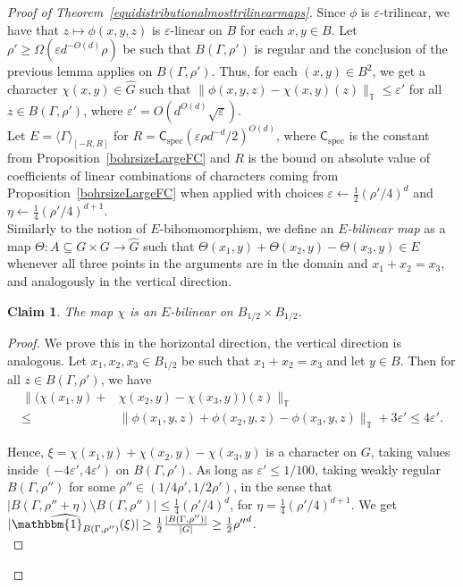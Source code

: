 \documentclass[a4paper,11pt]{article}
\numberwithin{theorem}{section}
\newtheorem{claim}[theorem]{Claim}
\theoremstyle{definition}
\newcommand\id{\mathbbm{1}}
\newcommand{\on}[1]{
	\operatorname{#1}
}
\begin{document}
\begin{proof}[Proof of Theorem~\ref{equidistributionalmosttrilinearmaps}]
    Since $\phi$ is $\varepsilon$-trilinear, we have that $z\mapsto \phi(x,y, z)$ is $\varepsilon$-linear on $B$ for each $x, y \in B$. Let $\rho' \geq \Omega(\varepsilon d^{-O(d)}\rho)$ be such that $B(\Gamma, \rho')$ is regular and the conclusion of the previous lemma applies on $B(\Gamma, \rho')$. Thus, for each $(x,y) \in B^2$, we get a character $\chi(x,y) \in \hat{G}$ such that $\|\phi(x,y, z) - \chi(x,y)(z)\|_{\mathbb{T}} \leq \varepsilon'$ for all $z \in B(\Gamma, \rho')$, where $\varepsilon' = O(d^{O(d)}\sqrt{\varepsilon})$. \\

    Let $E = \langle \Gamma \rangle_{[-R, R]}$ for $R = \mathsf{C}_{\on{spec}}(\varepsilon\rho d^{-d}/2)^{O(d)}$, where $\mathsf{C}_{\on{spec}}$ is the constant from Proposition~\ref{bohrsizeLargeFC} and $R$ is the bound on absolute value of coefficients of linear combinations of characters coming from Proposition~\ref{bohrsizeLargeFC} when applied with choices $\varepsilon \leftarrow \frac{1}{2}(\rho'/4)^d$  and $\eta \leftarrow  \frac{1}{4}(\rho'/4)^{d+1}$.\\
    \indent Similarly to the notion of $E$-bihomomorphism, we define an \textit{$E$-bilinear map} as a map $\Theta: A \subseteq G \times G \to \hat{G}$ such that $\Theta(x_1, y) + \Theta(x_2, y) - \Theta(x_3, y) \in E$ whenever all three points in the arguments are in the domain and $x_1  +x_2 = x_3$, and analogously in the vertical direction. 

    \begin{claim}\label{biasedtrilinearEbilinear}
        The map $\chi$ is an $E$-bilinear on $B_{1/2}\times B_{1/2}$.
    \end{claim}

    \begin{proof}
        We prove this in the horizontal direction, the vertical direction is analogous. Let $x_1, x_2, x_3 \in B_{1/2}$ be such that $x_1 + x_2 = x_3 $ and let $y \in B$. Then for all $z \in B(\Gamma, \rho')$, we have
        \begin{align*}\Big\|\Big(\chi(x_1,y) + &\chi(x_2, y) - \chi(x_3, y)\Big)(z)\Big\|_{\mathbb{T}} \\
        \leq &\Big\| \phi(x_1,y, z) + \phi(x_2, y, z) - \phi(x_3, y, z)\Big\|_{\mathbb{T}} + 3\varepsilon' \leq 4\varepsilon'.\end{align*}

        Hence, $\xi = \chi(x_1,y) + \chi(x_2, y) - \chi(x_3, y)$ is a character on $G$, taking values inside $(-4\varepsilon', 4\varepsilon')$ on $B(\Gamma, \rho')$. As long as $\varepsilon' \leq 1/100$, taking weakly regular $B(\Gamma, \rho'')$ for some $\rho'' \in (1/4\rho',1/2\rho')$, in the sense that $|B(\Gamma,\rho'' + \eta) \setminus B(\Gamma,\rho'')| \leq \frac{1}{4}(\rho'/4)^d$, for $\eta = \frac{1}{4}(\rho'/4)^{d+1}$. We get $|\widehat{\id_{B(\Gamma,\rho'')}}(\xi)| \geq \frac{1}{2}\frac{|B(\Gamma,\rho'')|}{|G|} \geq \frac{1}{2}{\rho''}^d$.\\ 
        

\end{proof}
\end{proof}
\end{document}
